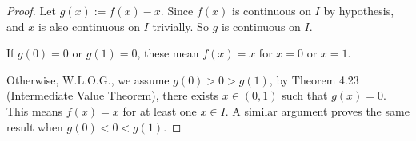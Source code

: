\begin{Exercise}
	\begin{proof}
		Let $g(x) := f(x) - x$. Since $f(x)$ is continuous on $I$ by hypothesis, and $x$ is also continuous on $I$ trivially. So $g$ is continuous on $I$.
		
		If $g(0) = 0$ or $g(1) = 0$, these mean $f(x) = x$ for $x=0$ or $x=1$. 
		
		Otherwise, W.L.O.G., we assume $g(0) > 0 > g(1)$, by Theorem 4.23 (Intermediate Value Theorem), there exists $x\in (0,1)$ such that $g(x) = 0$. This means $f(x) = x$ for at least one $x\in I$. A similar argument proves the same result when $g(0) < 0 < g(1)$.
	\end{proof}
\end{Exercise}